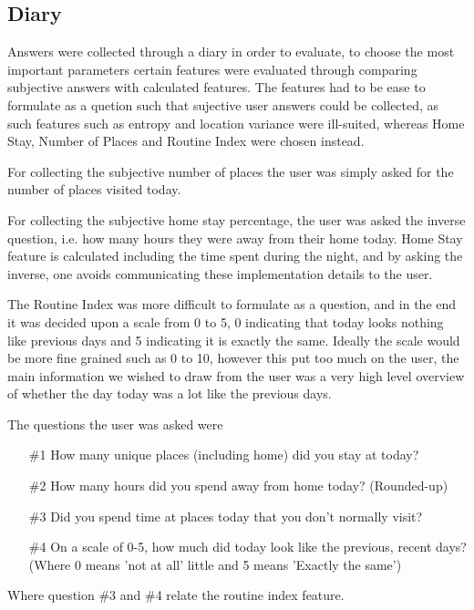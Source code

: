 \subsection{Diary}
Answers were collected through a diary in order to evaluate, to choose the most important parameters certain features were evaluated through comparing subjective answers with calculated features. The features had to be ease to formulate as a quetion such that sujective user answers could be collected, as such features such as entropy and location variance were ill-suited, whereas Home Stay, Number of Places and Routine Index were chosen instead. 

For collecting the subjective number of places the user was simply asked for the number of places visited today. 

For collecting the subjective home stay percentage, the user was asked the inverse question, i.e. how many hours they were away from their home today. Home Stay feature is calculated including the time spent during the night, and by asking the inverse, one avoids communicating these implementation details to the user. 

The Routine Index was more difficult to formulate as a question, and in the end it was decided upon a scale from 0 to 5, 0 indicating that today looks nothing like previous days and 5 indicating it is exactly the same. Ideally the scale would be more fine grained such as 0 to 10, however this put too much on the user, the main information we wished to draw from the user was a very high level overview of whether the day today was a lot like the previous days.

The questions the user was asked were

\begin{itemize}
    \item[\#1] How many unique places (including home) did you stay at today?
    \item[\#2] How many hours did you spend away from home today? (Rounded-up)
    \item[\#3] Did you spend time at places today that you don't normally visit?
    \item[\#4] On a scale of 0-5, how much did today look like the previous, recent days? (Where 0 means 'not at all' little and 5 means 'Exactly the same')
   
\end{itemize}

Where question \#3 and \#4 relate the routine index feature.

